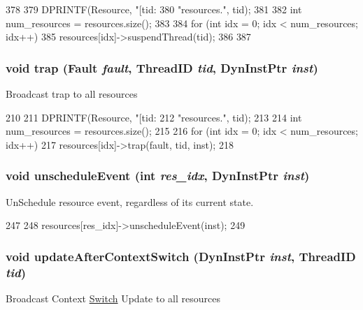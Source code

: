 \begin{DoxyCode}
378 {
379     DPRINTF(Resource, "[tid:%
380             "resources.\n", tid);
381 
382     int num_resources = resources.size();
383 
384     for (int idx = 0; idx < num_resources; idx++) {
385         resources[idx]->suspendThread(tid);
386     }
387 }
\end{DoxyCode}
\hypertarget{classResourcePool_abf76d6d245f7d3b17d26ea8dcc0cf36f}{
\subsubsection[{trap}]{\setlength{\rightskip}{0pt plus 5cm}void trap ({\bf Fault} {\em fault}, \/  {\bf ThreadID} {\em tid}, \/  {\bf DynInstPtr} {\em inst})}}
\label{classResourcePool_abf76d6d245f7d3b17d26ea8dcc0cf36f}
Broadcast trap to all resources 


\begin{DoxyCode}
210 {
211     DPRINTF(Resource, "[tid:%
212             "resources.\n", tid);
213 
214     int num_resources = resources.size();
215 
216     for (int idx = 0; idx < num_resources; idx++)
217         resources[idx]->trap(fault, tid, inst);
218 }
\end{DoxyCode}
\hypertarget{classResourcePool_a3102e3eb3a1648c4c448c0573142fd0b}{
\subsubsection[{unscheduleEvent}]{\setlength{\rightskip}{0pt plus 5cm}void unscheduleEvent (int {\em res\_\-idx}, \/  {\bf DynInstPtr} {\em inst})}}
\label{classResourcePool_a3102e3eb3a1648c4c448c0573142fd0b}
UnSchedule resource event, regardless of its current state. 


\begin{DoxyCode}
247 {
248     resources[res_idx]->unscheduleEvent(inst);
249 }
\end{DoxyCode}
\hypertarget{classResourcePool_a339073618ad3c21c492d64a55ce2e216}{
\subsubsection[{updateAfterContextSwitch}]{\setlength{\rightskip}{0pt plus 5cm}void updateAfterContextSwitch ({\bf DynInstPtr} {\em inst}, \/  {\bf ThreadID} {\em tid})}}
\label{classResourcePool_a339073618ad3c21c492d64a55ce2e216}
Broadcast Context \hyperlink{classSwitch}{Switch} Update to all resources 


